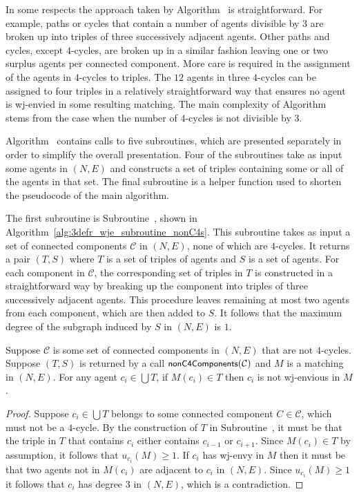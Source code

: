 In some respects the approach taken by Algorithm~ is straightforward. For example, paths or cycles that contain a number of agents divisible by $3$ are broken up into triples of three successively adjacent agents. Other paths and cycles, except $4$-cycles, are broken up in a similar fashion leaving one or two surplus agents per connected component. More care is required in the assignment of the agents in $4$-cycles to triples. The $12$ agents in three $4$-cycles can be assigned to four triples in a relatively straightforward way that ensures no agent is wj-envied in some resulting matching. The main complexity of Algorithm~ stems from the case when the number of $4$-cycles is not divisible by $3$.

Algorithm~ contains calls to five subroutines, which are presented separately in order to simplify the overall presentation. Four of the subroutines take as input some agents in $(N, E)$ and constructs a set of triples containing some or all of the agents in that set. The final subroutine is a helper function used to shorten the pseudocode of the main algorithm.

The first subroutine is Subroutine~, shown in Algorithm~\ref{alg:3defr_wje_subroutine_nonC4s}. This subroutine takes as input a set of connected components $\mathcal{C}$ in $(N, E)$, none of which are $4$-cycles. It returns a pair $(T, S)$ where $T$ is a set of triples of agents and $S$ is a set of agents. For each component in $\mathcal{C}$, the corresponding set of triples in $T$ is constructed in a straightforward way by breaking up the component into triples of three successively adjacent agents. This procedure leaves remaining at most two agents from each component, which are then added to $S$. It follows that the maximum degree of the subgraph induced by $S$ in $(N, E)$ is $1$.




\begin{lem}
\label{lem:threed_efr_as_max_degree_2_subgraph_nonC4s_part0}
Suppose $\mathcal{C}$ is some set of connected components in $(N, E)$ that are not $4$-cycles. Suppose $(T, S)$ is returned by a call $\algorithmfont{nonC4Components}(\mathcal{C})$ and $M$ is a matching in $(N, E)$. For any agent $c_i \in \bigcup T$, if $M(c_i) \in T$ then $c_i$ is not wj-envious in $M$.
\end{lem}
\begin{proof}
Suppose $c_i \in \bigcup T$ belongs to some connected component $C \in \mathcal{C}$, which must not be a $4$-cycle. By the construction of $T$ in Subroutine~, it must be that the triple in $T$ that contains $c_i$ either contains $c_{i-1}$ or $c_{i+1}$. Since $M(c_i) \in T$ by assumption, it follows that $u_{c_i}(M) \geq 1$. If $c_i$ has wj-envy in $M$ then it must be that two agents not in $M(c_i)$ are adjacent to $c_i$ in $(N, E)$. Since $u_{c_i}(M) \geq 1$ it follows that $c_i$ has degree $3$ in $(N, E)$, which is a contradiction.
\end{proof}

